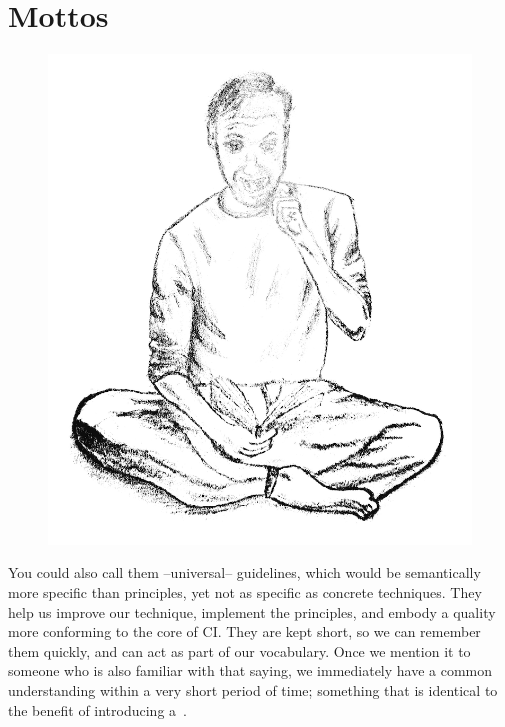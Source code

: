 \chapter{Mottos}\label{ch:mottos}

\begin{figure}[h]
    \begin{center}
    {\includegraphics[width=0.3\paperwidth]{images/testpic}}
    \end{center}\label{img:mottos}
\end{figure}

You could also call them --universal-- guidelines, which would be semantically more specific than principles, yet not as specific as concrete techniques.
They help us improve our technique, implement the principles, and embody a quality more conforming to the core of CI\@.
They are kept short, so we can remember them quickly, and can act as part of our vocabulary.
Once we mention it to someone who is also familiar with that saying, we immediately have a common understanding within a very short period of time; something that is identical to the benefit of introducing a~.

